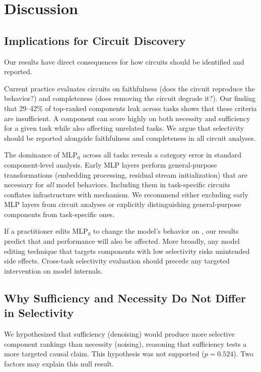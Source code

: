 \section{Discussion}
\label{sec:discussion}

\subsection{Implications for Circuit Discovery}
\label{sec:implications}

Our results have direct consequences for how circuits should be identified and reported.

 Current practice evaluates circuits on faithfulness (does the circuit reproduce the behavior?) and completeness (does removing the circuit degrade it?). Our finding that 29--42\% of top-ranked components leak across tasks shows that these criteria are insufficient. A component can score highly on both necessity and sufficiency for a given task while also affecting unrelated tasks. We argue that selectivity should be reported alongside faithfulness and completeness in all circuit analyses.

 The dominance of MLP$_0$ across all tasks reveals a category error in standard component-level analysis. Early MLP layers perform general-purpose transformations (embedding processing, residual stream initialization) that are necessary for \emph{all} model behaviors. Including them in task-specific circuits conflates infrastructure with mechanism. We recommend either excluding early MLP layers from circuit analyses or explicitly distinguishing general-purpose components from task-specific ones.

 If a practitioner edits MLP$_0$ to change the model's behavior on \ioi, our results predict that \sva and \gt performance will also be affected. More broadly, any model editing technique that targets components with low selectivity risks unintended side effects. Cross-task selectivity evaluation should precede any targeted intervention on model internals.

\subsection{Why Sufficiency and Necessity Do Not Differ in Selectivity}
\label{sec:why_no_diff}

We hypothesized that sufficiency (denoising) would produce more selective component rankings than necessity (noising), reasoning that sufficiency tests a more targeted causal claim. This hypothesis was not supported ($p = 0.524$). Two factors may explain this null result.

